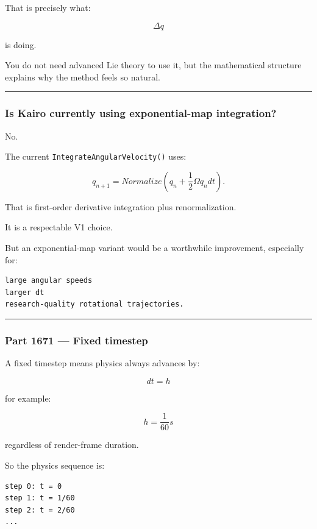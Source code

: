 That is precisely what:

\[
\Delta q
\]

is doing.

You do not need advanced Lie theory to use it, but the mathematical structure explains why the method feels so natural.

\begin{center}\rule{0.5\linewidth}{0.5pt}\end{center}

\subsubsection{Is Kairo currently using exponential-map integration?}\label{is-kairo-currently-using-exponential-map-integration}

No.

The current \texttt{IntegrateAngularVelocity()} uses:

\[
q_{n+1}
=
Normalize(
q_n+
\frac12\Omega q_n dt
).
\]

That is first-order derivative integration plus renormalization.

It is a respectable V1 choice.

But an exponential-map variant would be a worthwhile improvement, especially for:

\begin{verbatim}
large angular speeds
larger dt
research-quality rotational trajectories.
\end{verbatim}

\begin{center}\rule{0.5\linewidth}{0.5pt}\end{center}

\subsubsection{Part 1671 --- Fixed timestep}\label{part-1671-fixed-timestep}

A fixed timestep means physics always advances by:

\[
\boxed{
dt=h
}
\]

for example:

\[
h=\frac1{60}s
\]

regardless of render-frame duration.

So the physics sequence is:

\begin{verbatim}
step 0: t = 0
step 1: t = 1/60
step 2: t = 2/60
...
\end{verbatim}

